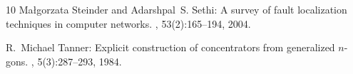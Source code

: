 \documentclass[11pt]{article}
\numberwithin{equation}{section}
\theoremstyle{definition}
\theoremstyle{plain}
\begin{document}
\begin{thebibliography}{10}
{\sc Ma{\l}gorzata Steinder and Adarshpal~S. Sethi}: A survey of fault
  localization techniques in computer networks.
, 53(2):165--194, 2004.

{\sc R.~Michael Tanner}: Explicit construction of concentrators from
  generalized $n$-gons.
, 5(3):287--293, 1984.
\newblock [\epfmtdoi{10.1137/0605030}]

\end{thebibliography}
\end{document}
